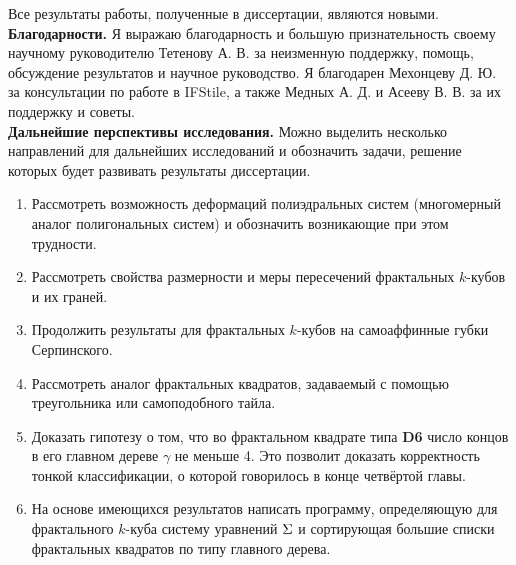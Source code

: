 Все результаты работы, полученные в диссертации, являются новыми.
\\

\textbf{Благодарности.}
Я выражаю благодарность и большую признательность своему научному руководителю Тетенову А. В. за неизменную поддержку, помощь, обсуждение результатов и научное руководство.
Я благодарен Мехонцеву Д. Ю.  за консультации по работе в IFStile, а также Медных А. Д. и Асееву В. В. за их поддержку и советы.\\


\textbf{Дальнейшие перспективы исследования.}
Можно выделить несколько направлений для дальнейших исследований и обозначить задачи, решение которых будет развивать результаты диссертации.
\begin{enumerate}
\item Рассмотреть возможность деформаций полиэдральных систем (многомерный аналог полигональных систем) и обозначить возникающие при этом трудности.
\item Рассмотреть свойства размерности и меры пересечений фрактальных $k$-кубов и их граней.
\item Продолжить результаты для фрактальных $k$-кубов на самоаффинные губки Серпинского.
\item Рассмотреть аналог фрактальных квадратов, задаваемый с помощью треугольника или самоподобного тайла.
\item Доказать гипотезу о том, что во фрактальном квадрате типа {\bf D6} число концов в его главном дереве $\gamma$ не меньше 4. 
Это позволит доказать корректность тонкой классификации, о которой говорилось в конце четвёртой главы.
\item На основе имеющихся результатов написать программу, определяющую для фрактального $k$-куба систему уравнений $\Sigma$ и сортирующая большие списки фрактальных квадратов по типу главного дерева.
\end{enumerate}